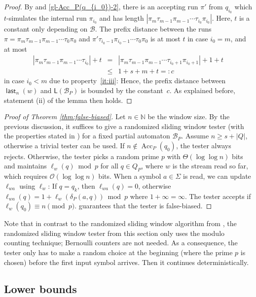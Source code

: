\documentclass{article}\usepackage[a4paper,margin=20mm]{geometry}
\newcommand{\N}{\mathbb{N}}
\newcommand{\B}{\mathcal{B}}
\renewcommand{\O}{\mathcal{O}}
\renewcommand{\L}{\mathsf{L}}
\DeclareMathOperator{\last}{\mathsf{last}}
\DeclareMathOperator{\Acc}{Acc}
\renewcommand{\geq}{\geqslant}
\renewcommand{\leq}{\leqslant}
\renewcommand{\ge}{\geq}
\renewcommand{\le}{\leq}
\begin{document}
\begin{proof}
By  and \eqref{gl-Acc_P(q_{i_0})-2}, there is an accepting run $\pi'$ from $q_{i_0}$
which $t$-simulates the internal run $\pi_{i_0}$ and has length $|\pi_m \tau_{m-1} \pi_{m-1} \cdots \tau_{i_0} \pi_{i_0}|$.
Here, $t$ is a constant only depending on $\B$.
The prefix distance between the runs
$\pi = \pi_m \tau_{m-1} \pi_{m-1} \cdots \tau_0 \pi_0$ and
$\pi' \tau_{i_0-1} \pi_{{i_0}-1} \cdots \tau_0 \pi_0$ 
is at most $t$ in case $i_0 = m$, and at most
\begin{eqnarray*}
	|\pi_m \tau_{m-1} \pi_{m-1} \cdots \tau_{i_0}| + t &=& |\pi_m \tau_{m-1} \pi_{m-1} \cdots \tau_{{i_0}+1} \pi_{{i_0}+1}| + 1 + t \\
	& \le & 1 + s + m + t =: c
\end{eqnarray*}
in case $i_0 < m$ due to property~\ref{it:iii}:
Hence, the prefix distance between $\last_n(w)$ and $\L(\B_P)$ is bounded by the constant~$c$. As explained before, statement (ii)
of the lemma then holds.
\end{proof}

\begin{proof}[Proof of Theorem \ref{thm:false-biased}]
Let $n \in \N$ be the window size. By the previous discussion,
it suffices to give a randomized sliding window tester (with the properties stated in )
for a fixed partial automaton $\B_P$.
Assume $n \ge s + |Q|$, otherwise a trivial tester can be used.
If $n \notin \Acc_P(q_0)$, the tester always rejects. Otherwise, the tester picks a random prime $p$ with
$\Theta(\log \log n)$ bits and maintains $\ell_w(q) \bmod p$ for all $q \in Q_P$,
where $w$ is the stream read so far, which requires $\O(\log \log n)$ bits.
When a symbol $a \in \Sigma$ is read, we can update $\ell_{wa}$ using $\ell_w$: 
If $q = q_k$, then $\ell_{wa}(q) = 0$, otherwise $\ell_{wa}(q) = 1 + \ell_w(\delta_P(a,q)) \bmod p$
where $1 + \infty = \infty$. The tester accepts if $\ell_w(q_0) \equiv n \pmod p$. 
 guarantees that the tester is false-biased.
\end{proof}
Note that in contrast to the randomized sliding window algorithm from , the 
randomized sliding window tester from this section only uses the modulo counting technique; Bernoulli counters are not needed.
As a consequence, the tester only has to make a random choice at the beginning (where the prime $p$ is chosen) before the first input symbol arrives. Then it 
continues deterministically. 


\subsection{Lower bounds}
\end{document}
